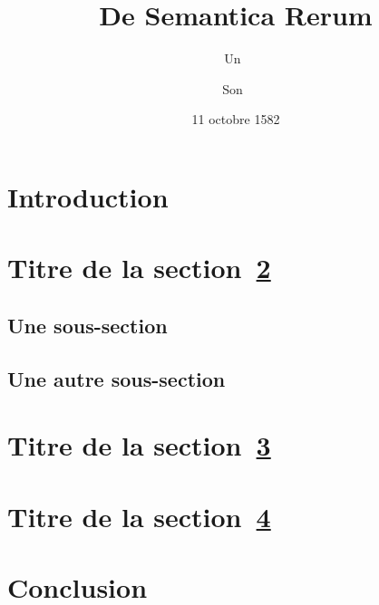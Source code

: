 \documentclass[11pt]{scrartcl}
\begin{document}
\author{Un~ \and Son~}
\date{11 octobre 1582}
\title{De Semantica Rerum}
\maketitle

\begin{abstract}
  \kant[1]
\end{abstract}

\section{Introduction}
\kant[2-3]

\section{Titre de la section~\ref{sec:labsec1}}
\label{sec:labsec1}
\subsection{Une sous-section}
\kant[4-5]
\subsection{Une autre sous-section}
\kant[5-6]

\section{Titre de la section~\ref{sec:labsec2}}
\label{sec:labsec2}
\kant[7-8]

\section{Titre de la section~\ref{sec:labsec3}}
\label{sec:labsec3}
\kant[9-10]

\section{Conclusion}
\kant[164]
\end{document}
